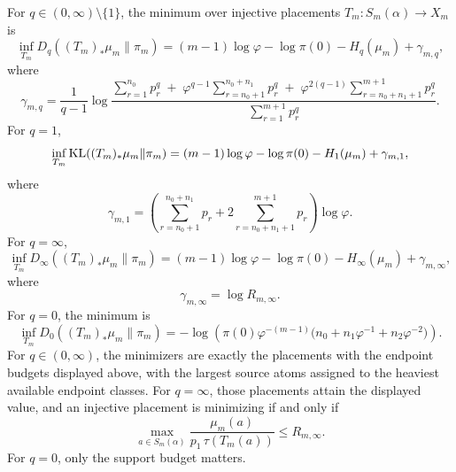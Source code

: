 \begin{proposition}
For \(q\in(0,\infty)\setminus\{1\}\), the minimum over injective placements
\(T_m:S_m(\alpha)\to X_m\) is
\[
\inf_{T_m}D_q((T_m)_*\mu_m\|\pi_m)
=
(m-1)\log\varphi-\log\pi(0)-H_q(\mu_m)+\gamma_{m,q},
\]
where
\[
\gamma_{m,q}
=
\frac{1}{q-1}\log
\frac{
\sum_{r=1}^{n_0}p_r^q
\;+\;\varphi^{q-1}\sum_{r=n_0+1}^{n_0+n_1}p_r^q
\;+\;\varphi^{2(q-1)}\sum_{r=n_0+n_1+1}^{m+1}p_r^q}
{\sum_{r=1}^{m+1}p_r^q}.
\]
For \(q=1\),
\[
\inf_{T_m}\operatorname{KL}((T_m)_*\mu_m\|\pi_m)
=
(m-1)\log\varphi-\log\pi(0)-H_1(\mu_m)+\gamma_{m,1},
\]
where
\[
\gamma_{m,1}
=
\left(\sum_{r=n_0+1}^{n_0+n_1}p_r
+2\sum_{r=n_0+n_1+1}^{m+1}p_r\right)\log\varphi.
\]
For \(q=\infty\),
\[
\inf_{T_m}D_\infty((T_m)_*\mu_m\|\pi_m)
=
(m-1)\log\varphi-\log\pi(0)-H_\infty(\mu_m)+\gamma_{m,\infty},
\]
where
\[
\gamma_{m,\infty}
=
\log R_{m,\infty}.
\]
For \(q=0\), the minimum is
\[
\inf_{T_m}D_0((T_m)_*\mu_m\|\pi_m)
=
-\log\!\left(
\pi(0)\varphi^{-(m-1)}
\bigl(n_0+n_1\varphi^{-1}+n_2\varphi^{-2}\bigr)
\right).
\]
For \(q\in(0,\infty)\), the minimizers are exactly the placements with the
endpoint budgets displayed above, with the largest source atoms assigned to the
heaviest available endpoint classes.  For \(q=\infty\), those placements attain
the displayed value, and an injective placement is minimizing if and only if
\[
\max_{a\in S_m(\alpha)}
\frac{\mu_m(a)}{p_1\,\tau(T_m(a))}
\le R_{m,\infty}.
\]
For \(q=0\), only the support budget matters.
\end{proposition}

